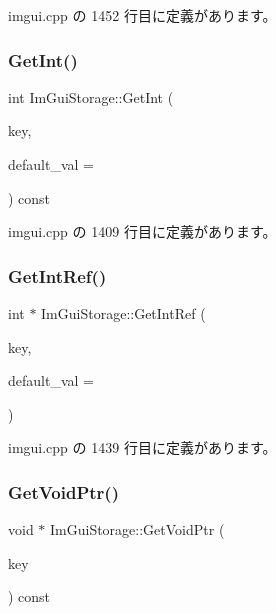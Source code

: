  imgui.\+cpp の 1452 行目に定義があります。

\mbox{\label{struct_im_gui_storage_ac86b64f5c69a15de6c6c326963eca64a}} 
\subsubsection{\texorpdfstring{Get\+Int()}{GetInt()}}
{\footnotesize\ttfamily int Im\+Gui\+Storage\+::\+Get\+Int (\begin{DoxyParamCaption}\item[{\mbox{\hyperlink{imgui_8h_a1785c9b6f4e16406764a85f32582236f}{Im\+Gui\+ID}}}]{key,  }\item[{int}]{default\+\_\+val = {} }\end{DoxyParamCaption}) const}



 imgui.\+cpp の 1409 行目に定義があります。

\mbox{\label{struct_im_gui_storage_a28673fa7839263f3066ccb8e93e748a9}} 
\subsubsection{\texorpdfstring{Get\+Int\+Ref()}{GetIntRef()}}
{\footnotesize\ttfamily int $\ast$ Im\+Gui\+Storage\+::\+Get\+Int\+Ref (\begin{DoxyParamCaption}\item[{\mbox{\hyperlink{imgui_8h_a1785c9b6f4e16406764a85f32582236f}{Im\+Gui\+ID}}}]{key,  }\item[{int}]{default\+\_\+val = {} }\end{DoxyParamCaption})}



 imgui.\+cpp の 1439 行目に定義があります。

\mbox{\label{struct_im_gui_storage_aaf87a98ede89da09113b0189f6d878ca}} 
\subsubsection{\texorpdfstring{Get\+Void\+Ptr()}{GetVoidPtr()}}
{\footnotesize\ttfamily void $\ast$ Im\+Gui\+Storage\+::\+Get\+Void\+Ptr (\begin{DoxyParamCaption}\item[{\mbox{\hyperlink{imgui_8h_a1785c9b6f4e16406764a85f32582236f}{Im\+Gui\+ID}}}]{key }\end{DoxyParamCaption}) const}



